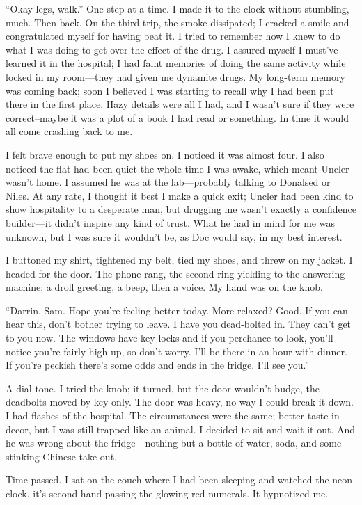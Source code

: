 ``Okay legs, walk.'' One step at a time. I made it to the clock without
stumbling, much. Then back. On the third trip, the smoke dissipated; I
cracked a smile and congratulated myself for having beat it. I tried to
remember how I knew to do what I was doing to get over the effect of the
drug. I assured myself I must've learned it in the hospital; I had faint
memories of doing the same activity while locked in my room---they had
given me dynamite drugs. My long-term memory was coming back; soon I
believed I was starting to recall why I had been put there in the first
place. Hazy details were all I had, and I wasn't sure if they were
correct--maybe it was a plot of a book I had read or something. In time
it would all come crashing back to me.

I felt brave enough to put my shoes on. I noticed it was almost four. I
also noticed the flat had been quiet the whole time I was awake, which
meant Uncler wasn't home. I assumed he was at the lab---probably talking
to Donalsed or Niles. At any rate, I thought it best I make a quick
exit; Uncler had been kind to show hospitality to a desperate man, but
drugging me wasn't exactly a confidence builder---it didn't inspire any
kind of trust. What he had in mind for me was unknown, but I was sure it
wouldn't be, as Doc would say, in my best interest.

I buttoned my shirt, tightened my belt, tied my shoes, and threw on my
jacket. I headed for the door. The phone rang, the second ring yielding
to the answering machine; a droll greeting, a beep, then a voice. My
hand was on the knob.

``Darrin. Sam. Hope you're feeling better today. More relaxed? Good. If
you can hear this, don't bother trying to leave. I have you dead-bolted
in. They can't get to you now. The windows have key locks and if you
perchance to look, you'll notice you're fairly high up, so don't worry.
I'll be there in an hour with dinner. If you're peckish there's some
odds and ends in the fridge. I'll see you.''

A dial tone. I tried the knob; it turned, but the door wouldn't budge,
the deadbolts moved by key only. The door was heavy, no way I could
break it down. I had flashes of the hospital. The circumstances were the
same; better taste in decor, but I was still trapped like an animal. I
decided to sit and wait it out. And he was wrong about the
fridge---nothing but a bottle of water, soda, and some stinking Chinese
take-out.

Time passed. I sat on the couch where I had been sleeping and watched
the neon clock, it's second hand passing the glowing red numerals. It
hypnotized me.

